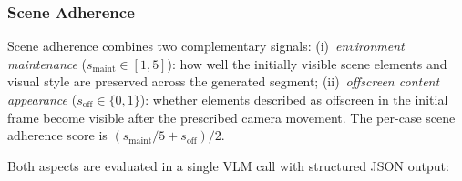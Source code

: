 \subsubsection{Scene Adherence}
\label{app:scene_adherence_detail}

Scene adherence combines two complementary signals:
(i)~\emph{environment maintenance} ($s_{\mathrm{maint}} \in [1,5]$): how well the initially visible scene elements and visual style are preserved across the generated segment;
(ii)~\emph{offscreen content appearance} ($s_{\mathrm{off}} \in \{0,1\}$): whether elements described as offscreen in the initial frame become visible after the prescribed camera movement.
The per-case scene adherence score is $(s_{\mathrm{maint}}/5 + s_{\mathrm{off}}) / 2$.

Both aspects are evaluated in a single VLM call with structured JSON output:

